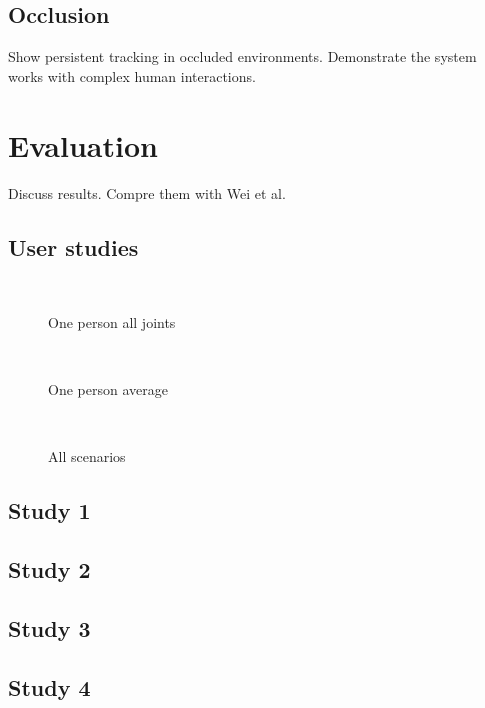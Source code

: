 \documentclass{sigchi}
\begin{document}
\subsection{Occlusion}

Show persistent tracking in occluded environments. Demonstrate the system works with complex human interactions.
 
\section{Evaluation}

Discuss results. Compre them with Wei et al.

\subsection{User studies}

\begin{figure}
  \centering
  
  \caption{One person all joints}~\label{fig:one_person_all}
\end{figure}

\begin{figure}
  \centering
  
  \caption{One person average}~\label{fig:one_person_average}
\end{figure}

\begin{figure}
  \centering
  
  \caption{All scenarios}~\label{fig:scenarios}
\end{figure}

\subsection{Study 1}

\subsection{Study 2}

\subsection{Study 3}

\subsection{Study 4}
\end{document}
